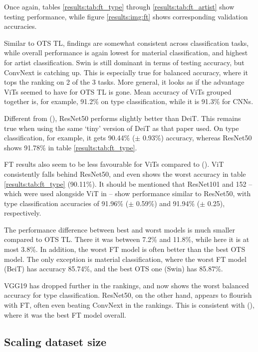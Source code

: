 Once again, tables \ref{results:tab:ft_type} through \ref{results:tab:ft_artist} show testing performance, while figure \ref{results:img:ft} shows corresponding validation accuracies.

Similar to OTS TL, findings are somewhat consistent across classification tasks, while overall performance is again lowest for material classification, and highest for artist classification. Swin is still dominant in terms of testing accuracy, but Conv\-Next is catching up. This is especially true for balanced accuracy, where it tops the ranking on 2 of the 3 tasks. More general, it looks as if the advantage ViTs seemed to have for OTS TL is gone. Mean accuracy of ViTs grouped together is, for example, 91.2\% on type classification, while it is 91.3\% for CNNs.

Different from \citeauthor{matsoukas2021time} (\citeyear{matsoukas2021time}), ResNet50 performs slightly better than DeiT. This remains true when using the same `tiny' version of DeiT as that paper used. On type classification, for example, it gets 90.44\% ($\pm$ 0.93\%) accuracy, whereas ResNet50 shows 91.78\% in table \ref{results:tab:ft_type}.

FT results also seem to be less favourable for ViTs compared to \citeauthor{zhou2021convnets} (\citeyear{zhou2021convnets}). ViT consistently falls behind ResNet50, and even shows the worst accuracy in table \ref{results:tab:ft_type} (90.11\%). It should be mentioned that ResNet101 and 152  -- which were used alongside ViT in \citeauthor{zhou2021convnets} --  show performance similar to ResNet50, with type classification accuracies of 91.96\% ($\pm$ 0.59\%) and 91.94\% ($\pm$ 0.25), respectively.

The performance difference between best and worst models is much smaller compared to OTS TL. There it was between 7.2\% and 11.8\%, while here it is at most 3.8\%. In addition, the worst FT model is often better than the best OTS model. The only exception is material classification, where the worst FT model (BeiT) has accuracy 85.74\%, and the best OTS one (Swin) has 85.87\%.

VGG19 has dropped further in the rankings, and now shows the worst balanced accuracy for type classification. ResNet50, on the other hand, appears to flourish with FT, often even beating ConvNext in the rankings. This is consistent with \citeauthor{sabatelli2018deep} (\citeyear{sabatelli2018deep}), where it was the best FT model overall.

\subsection{Scaling dataset size}

